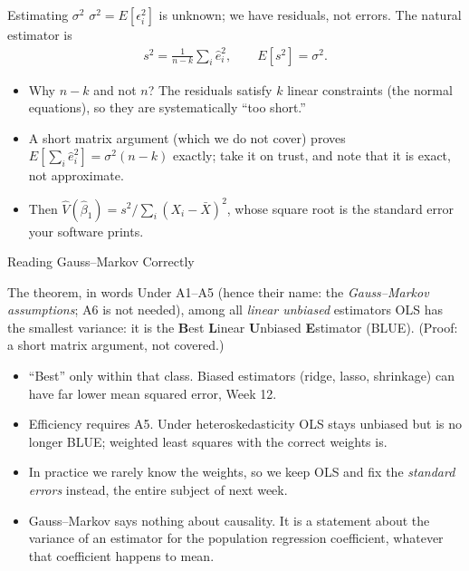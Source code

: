 \documentclass[aspectratio=169,11pt,xcolor=dvipsnames]{beamer}
\newcommand{\E}{E}
\begin{document}
\begin{frame}{Estimating $\sigma^2$}
$\sigma^2 = \E[\epsilon_i^2]$ is unknown; we have residuals, not errors. The
natural estimator is
\begin{align*}
  s^2 = \frac{1}{n-k}\sum_i \hat e_i^2 ,
  \qquad \E[s^2] = \sigma^2 .
\end{align*}
\begin{itemize}\itemsep3pt
  \item Why $n-k$ and not $n$? The residuals satisfy $k$ linear constraints
        (the normal equations), so they are systematically ``too short.''
  \item A short matrix argument (which we do not cover) proves
        $\E[\sum_i \hat e_i^2] = \sigma^2(n-k)$ exactly; take it on trust,
        and note that it is exact, not approximate.
  \item Then $\hat{V}(\hat\beta_1) = s^2/\sum_i (X_i-\bar X)^2$, whose
        square root is the standard error your software prints.
\end{itemize}
\end{frame}

\begin{frame}{Reading Gauss--Markov Correctly}
\begin{block}{The theorem, in words}
Under A1--A5 (hence their name: the \emph{Gauss--Markov assumptions}; A6 is
not needed), among all \emph{linear unbiased} estimators OLS has the smallest
variance: it is the \textbf{B}est \textbf{L}inear \textbf{U}nbiased
\textbf{E}stimator (BLUE). (Proof: a short matrix argument, not covered.)
\end{block}
\begin{itemize}\itemsep3pt
  \item ``Best'' only \alert{within that class}. Biased estimators (ridge,
        lasso, shrinkage) can have far lower mean squared error, Week 12.
  \item Efficiency requires A5. Under heteroskedasticity OLS stays unbiased but is
        no longer BLUE; weighted least squares with the correct weights is.
  \item In practice we rarely know the weights, so we keep OLS and fix the
        \emph{standard errors} instead, the entire subject of next week.
  \item Gauss--Markov says nothing about causality. It is a statement about the
        variance of an estimator for the population regression coefficient,
        whatever that coefficient happens to mean.
\end{itemize}
\end{frame}
\end{document}
